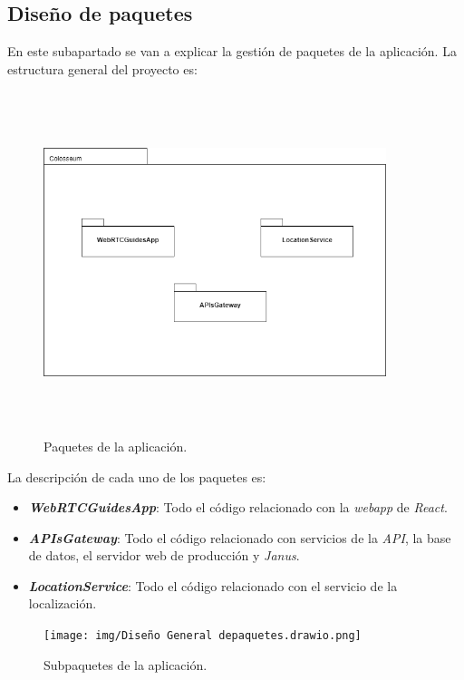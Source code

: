 \subsection{Diseño de paquetes}
En este subapartado se van a explicar la gestión de paquetes de la aplicación. La estructura general del proyecto es:
\FloatBarrier
\begin{figure}[h]
    \centering
    \includegraphics[width=10cm,height=10cm,keepaspectratio]{img/packetsGeneral.drawio (1).png}
    \caption{Paquetes de la aplicación.}
    \label{fig:diagram_seceunce_guide}
\end{figure}
\FloatBarrier
La descripción de cada uno de los paquetes es:
\begin{itemize}
    \item \textit{\textbf{WebRTCGuidesApp}}: Todo el código relacionado con la \textit{webapp} de \textit{React}.
    \item \textit{\textbf{APIsGateway}}: Todo el código relacionado con servicios de la \textit{API}, la base de datos, el servidor web de producción y \textit{Janus}.
    \item \textit{\textbf{LocationService}}: Todo el código relacionado con el servicio de la localización.
\end{itemize}
\FloatBarrier
\begin{figure}[h]
    \centering
    \texttt{[image: img/Diseño General depaquetes.drawio.png]}
    \caption{Subpaquetes de la aplicación.}
    \label{fig:diagram_seceunce_guide}
\end{figure}
\FloatBarrier


